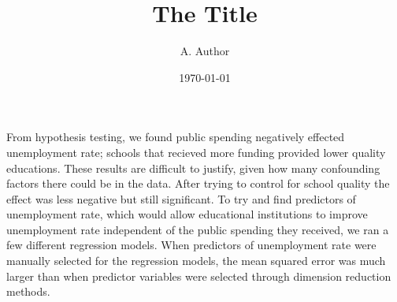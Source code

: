\documentclass{article}
\begin{document}


\title{The Title}
\author{A. Author}
\date{\today}

\maketitle

From hypothesis testing, we found public spending negatively effected unemployment rate; schools that recieved more funding provided lower quality educations. These results are difficult to justify, given how many confounding factors there could be in the data. After trying to control for school quality the effect was less negative but still significant. To try and find predictors of unemployment rate, which would allow educational institutions to improve unemployment rate independent of the public spending they received, we ran a few different regression models. When predictors of unemployment rate were manually selected for the regression models, the mean squared error was much larger than when predictor variables were selected through dimension reduction methods. 
\end{document}
